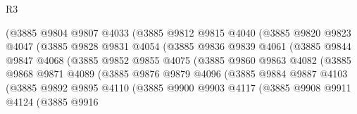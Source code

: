 \begin{lexlean}{R3}
\begin{coremodule}
                        (@3885
                          @9804
                          @9807
                          @4033
                          (@3885
                            @9812
                            @9815
                            @4040
                            (@3885
                              @9820
                              @9823
                              @4047
                              (@3885
                                @9828
                                @9831
                                @4054
                                (@3885
                                  @9836
                                  @9839
                                  @4061
                                  (@3885
                                    @9844
                                    @9847
                                    @4068
                                    (@3885
                                      @9852
                                      @9855
                                      @4075
                                      (@3885
                                        @9860
                                        @9863
                                        @4082
                                        (@3885
                                          @9868
                                          @9871
                                          @4089
                                          (@3885
                                            @9876
                                            @9879
                                            @4096
                                            (@3885
                                              @9884
                                              @9887
                                              @4103
                                              (@3885
                                                @9892
                                                @9895
                                                @4110
                                                (@3885
                                                  @9900
                                                  @9903
                                                  @4117
                                                  (@3885
                                                    @9908
                                                    @9911
                                                    @4124
                                                    (@3885
                                                      @9916

\end{coremodule}
\end{lexlean}
